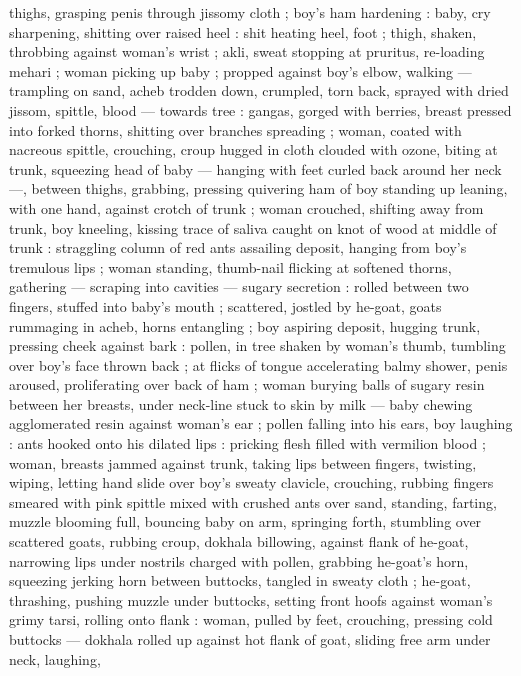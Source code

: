 thighs, grasping penis through jissomy cloth ; boy's ham hardening
: baby, cry sharpening, shitting over raised heel : shit heating heel,
foot ; thigh, shaken, throbbing against woman's wrist ; akli, sweat
stopping at pruritus, re-loading mehari ; woman picking up baby ;
propped against boy's elbow, walking --- trampling on sand, acheb
trodden down, crumpled, torn back, sprayed with dried jissom,
spittle, blood --- towards tree : gangas, gorged with berries, breast
pressed into forked thorns, shitting over branches spreading ;
woman, coated with nacreous spittle, crouching, croup hugged in
cloth clouded with ozone, biting at trunk, squeezing head of baby ---
hanging with feet curled back around her neck ---, between thighs,
grabbing, pressing quivering ham of boy standing up leaning, with
one hand, against crotch of trunk ; woman crouched, shifting away
from trunk, boy kneeling, kissing trace of saliva caught on knot of
wood at middle of trunk : straggling column of red ants assailing
deposit, hanging from boy's tremulous lips ; woman standing,
thumb-nail flicking at softened thorns, gathering --- scraping into
cavities --- sugary secretion : rolled between two fingers, stuffed into
baby’s mouth ; scattered, jostled by he-goat, goats rummaging in
acheb, horns entangling ; boy aspiring deposit, hugging trunk,
pressing cheek against bark : pollen, in tree shaken by woman's
thumb, tumbling over boy's face thrown back ; at flicks of tongue
accelerating balmy shower, penis aroused, proliferating over back of
ham ; woman burying balls of sugary resin between her breasts,
under neck-line stuck to skin by milk --- baby chewing agglomerated
resin against woman's ear ; pollen falling into his ears, boy laughing
: ants hooked onto his dilated lips : pricking flesh filled with vermilion
blood ; woman, breasts jammed against trunk, taking lips between
fingers, twisting, wiping, letting hand slide over boy's sweaty clavicle,
crouching, rubbing fingers smeared with pink spittle mixed with
crushed ants over sand, standing, farting, muzzle blooming full,
bouncing baby on arm, springing forth, stumbling over scattered
goats, rubbing croup, dokhala billowing, against flank of he-goat,
narrowing lips under nostrils charged with pollen, grabbing he-goat's
horn, squeezing jerking horn between buttocks, tangled in sweaty
cloth ; he-goat, thrashing, pushing muzzle under buttocks, setting
front hoofs against woman's grimy tarsi, rolling onto flank : woman,
pulled by feet, crouching, pressing cold buttocks --- dokhala rolled
up against hot flank of goat, sliding free arm under neck, laughing,
